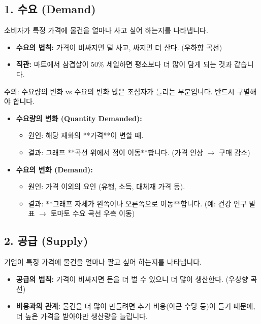 \documentclass[11pt,a4paper]{article}
\begin{document}
\subsection{1. 수요 (Demand)}
소비자가 특정 가격에 물건을 얼마나 사고 싶어 하는지를 나타냅니다.
\begin{itemize}
    \item \textbf{수요의 법칙:} 가격이 비싸지면 덜 사고, 싸지면 더 산다. (우하향 곡선)
    \item \textbf{직관:} 마트에서 삼겹살이 50\% 세일하면 평소보다 더 많이 담게 되는 것과 같습니다.
\end{itemize}

\begin{alertbox}{주의: 수요량의 변화 vs 수요의 변화}
많은 초심자가 틀리는 부분입니다. 반드시 구별해야 합니다.
\begin{itemize}
    \item \textbf{수요량의 변화 (Quantity Demanded):} 
    \begin{itemize}
        \item 원인: 해당 재화의 **가격**이 변할 때.
        \item 결과: 그래프 **곡선 위에서 점이 이동**합니다. (가격 인상 $\rightarrow$ 구매 감소)
    \end{itemize}
    \item \textbf{수요의 변화 (Demand):} 
    \begin{itemize}
        \item 원인: 가격 이외의 요인 (유행, 소득, 대체재 가격 등).
        \item 결과: **그래프 자체가 왼쪽이나 오른쪽으로 이동**합니다. (예: 건강 연구 발표 $\rightarrow$ 토마토 수요 곡선 우측 이동)
    \end{itemize}
\end{itemize}
\end{alertbox}

\subsection{2. 공급 (Supply)}
기업이 특정 가격에 물건을 얼마나 팔고 싶어 하는지를 나타냅니다.
\begin{itemize}
    \item \textbf{공급의 법칙:} 가격이 비싸지면 돈을 더 벌 수 있으니 더 많이 생산한다. (우상향 곡선)
    \item \textbf{비용과의 관계:} 물건을 더 많이 만들려면 추가 비용(야근 수당 등)이 들기 때문에, 더 높은 가격을 받아야만 생산량을 늘립니다.
\end{itemize}
\end{document}
